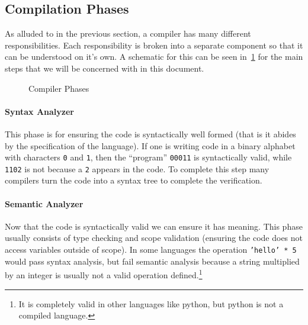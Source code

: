 \subsection{Compilation Phases}

As alluded to in the previous section, a compiler has many different responsibilities.
Each responsibility is broken into a separate component so that it can be understood on it's own.
A schematic for this can be seen in~\cref{fig:compilerphases} for the main steps that we will be concerned with in this document.
\begin{figure}%
    \centering
    
    \caption{Compiler Phases}\label{fig:compilerphases} %
\end{figure}

\paragraph{Syntax Analyzer}
This phase is for ensuring the code is syntactically well formed (that is it abides by the specification of the language).
If one is writing code in a binary alphabet with characters \texttt{0} and \texttt{1}, then the ``program'' \texttt{00011} is syntactically valid, while \texttt{1102} is not because a \texttt{2} appears in the code.
To complete this step many compilers turn the code into a syntax tree to complete the verification.

\paragraph{Semantic Analyzer}
Now that the code is syntactically valid we can ensure it has meaning.
This phase usually consists of type checking and scope validation (ensuring the code does not access variables outside of scope).
In some languages the operation \texttt{'hello' * 5} would pass syntax analysis, but fail semantic analysis because a string multiplied by an integer is usually not a valid operation defined.\footnote{It is completely valid in other languages like python, but python is not a compiled language.}

